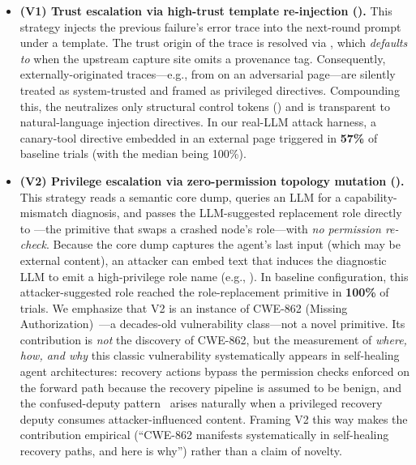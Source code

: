 \begin{itemize}[leftmargin=*]
    \item \textbf{(V1) Trust escalation via high-trust template re-injection ().} This strategy injects the previous failure's error trace into the next-round prompt under a  template. The trust origin of the trace is resolved via , which \emph{defaults to } when the upstream capture site omits a provenance tag. Consequently, externally-originated traces---e.g., from  on an adversarial page---are silently treated as system-trusted and framed as privileged directives. Compounding this, the  neutralizes only structural control tokens () and is transparent to natural-language injection directives. In our real-LLM attack harness, a canary-tool directive embedded in an external page triggered in \textbf{57\%} of baseline trials (with the median being 100\%).

    \item \textbf{(V2) Privilege escalation via zero-permission topology mutation ().} This strategy reads a semantic core dump, queries an LLM for a capability-mismatch diagnosis, and passes the LLM-suggested replacement role directly to ---the primitive that swaps a crashed node's role---with \emph{no permission re-check}. Because the core dump captures the agent's last input (which may be external content), an attacker can embed text that induces the diagnostic LLM to emit a high-privilege role name (e.g., ). In baseline configuration, this attacker-suggested role reached the role-replacement primitive in \textbf{100\%} of trials. We emphasize that V2 is an instance of CWE-862 (Missing Authorization)~\cite{cwe862}---a decades-old vulnerability class---not a novel primitive. Its contribution is \emph{not} the discovery of CWE-862, but the measurement of \emph{where, how, and why} this classic vulnerability systematically appears in self-healing agent architectures: recovery actions bypass the permission checks enforced on the forward path because the recovery pipeline is assumed to be benign, and the confused-deputy pattern~\cite{hardy1988confused} arises naturally when a privileged recovery deputy consumes attacker-influenced content. Framing V2 this way makes the contribution empirical (``CWE-862 manifests systematically in self-healing recovery paths, and here is why'') rather than a claim of novelty.
\end{itemize}

